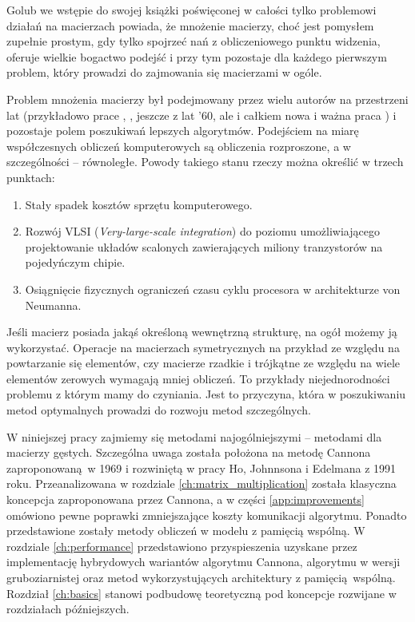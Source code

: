 Golub\cite{Golub} we wstępie do swojej książki poświęconej w całości tylko problemowi działań na macierzach powiada, że mnożenie macierzy, choć jest pomysłem zupełnie prostym, gdy tylko spojrzeć nań z obliczeniowego punktu widzenia, oferuje wielkie bogactwo podejść i przy tym pozostaje dla każdego pierwszym problem, który prowadzi do zajmowania się macierzami w ogóle. 


Problem mnożenia macierzy był podejmowany przez wielu autorów na przestrzeni lat (przykładowo prace \cite{Strassen68}, \cite{Winograd}, \cite{Cannon:1969:CCI:905686} jeszcze z lat '60, ale i całkiem nowa i ważna praca \cite{DBLP:journals/corr/abs-1202-3173}) i pozostaje polem poszukiwań lepszych algorytmów. Podejściem na miarę współczesnych obliczeń komputerowych są obliczenia rozproszone, a w szczególności -- równoległe. Powody takiego stanu rzeczy można określić w trzech punktach:
\begin{enumerate}
\item{Stały spadek kosztów sprzętu komputerowego.}
\item{Rozwój VLSI (\emph{Very-large-scale integration}) do poziomu umożliwiającego projektowanie układów scalonych zawierających miliony tranzystorów na pojedyńczym chipie.}
\item{Osiągnięcie fizycznych ograniczeń czasu cyklu procesora w architekturze von Neumanna.}
\end{enumerate}


Jeśli macierz posiada jakąś określoną wewnętrzną strukturę, na ogół możemy ją wykorzystać. Operacje na macierzach symetrycznych na przykład ze względu na powtarzanie się elementów, czy macierze rzadkie i trójkątne ze względu na wiele elementów zerowych wymagają mniej obliczeń. To przykłady niejednorodności problemu z którym mamy do czyniania. Jest to przyczyna, która w poszukiwaniu metod optymalnych prowadzi do rozwoju metod szczególnych. 


W niniejszej pracy zajmiemy się metodami najogólniejszymi -- metodami dla macierzy gęstych. Szczególna uwaga została położona na metodę Cannona\cite{Cannon:1969:CCI:905686} zaproponowaną w 1969 i rozwiniętą w pracy Ho, Johnnsona i Edelmana\cite{Ching-TienHo1991} z 1991 roku. Przeanalizowana w rozdziale \ref{ch:matrix_multiplication} została klasyczna koncepcja zaproponowana przez Cannona, a w części \ref{app:improvements} omówiono pewne poprawki zmniejszające koszty komunikacji algorytmu. Ponadto przedstawione zostały metody obliczeń w modelu z pamięcią wspólną. W rozdziale \ref{ch:performance} przedstawiono przyspieszenia uzyskane przez implementację hybrydowych wariantów algorytmu Cannona, algorytmu w wersji gruboziarnistej oraz metod wykorzystujących architektury z pamięcią wspólną.
Rozdział \ref{ch:basics} stanowi podbudowę teoretyczną pod koncepcje rozwijane w rozdziałach późniejszych.


